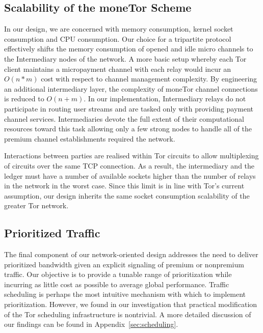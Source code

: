 \subsection{Scalability of the moneTor Scheme}
\label{subsub:scalability}

In our design, we are concerned with memory consumption, kernel socket
consumption and CPU consumption. Our choice for a tripartite protocol
effectively shifts the memory consumption of opened and idle micro channels to
the Intermediary nodes of the network. A more basic setup whereby each Tor
client maintains a micropayment channel with each relay would incur an $O(n*m)$
cost with respect to channel management complexity. By engineering an additional
intermediary layer, the complexity of moneTor channel connections is reduced to
$O(n+m)$. In our implementation, Intermediary relays do not participate in
routing user streams and are tasked only with providing payment channel
services. Intermediaries devote the full extent of their computational resources
toward this task allowing only a few strong nodes to handle all of the premium
channel establishments required the network.

Interactions between parties are realised within Tor circuits to allow
multiplexing of circuits over the same TCP connection. As a result, the
intermediary and the ledger must have a number of available sockets higher than
the number of relays in the network in the worst case. Since this limit is in
line with Tor's current assumption, our design inherits the same socket
consumption scalability of the greater Tor network.

\subsection{Prioritized Traffic}
\label{subsub:prioritized}

The final component of our network-oriented design addresses the need to deliver
prioritized bandwidth given an explicit signaling of premium or nonpremium
traffic. Our objective is to provide a tunable range of prioritization while
incurring as little cost as possible to average global performance. Traffic
scheduling is perhaps the most intuitive mechanism with which to implement
prioritization. However, we found in our investigation that practical
modification of the Tor scheduling infrastructure is nontrivial. A more detailed
discussion of our findings can be found in Appendix~\ref{sec:scheduling}.

